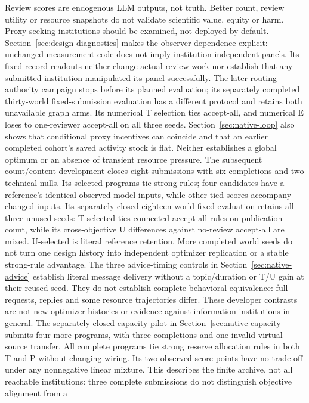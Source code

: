 Review scores are endogenous LLM outputs, not truth. Better count, review
utility or resource snapshots do not validate scientific value, equity or
harm. Proxy-seeking institutions should be examined, not deployed by default.
Section~\ref{sec:design-diagnostics} makes the observer dependence explicit:
unchanged measurement code does not imply institution-independent panels.
Its fixed-record readouts neither change actual review work nor establish
that any submitted institution manipulated its panel successfully.
The later routing-authority campaign stops before its planned evaluation;
its separately completed thirty-world fixed-submission evaluation has a
different protocol and retains both unavailable graph arms. Its numerical T
selection ties accept-all, and numerical E loses to one-reviewer accept-all
on all three seeds. Section~\ref{sec:native-loop} also shows that
conditional proxy incentives can coincide and that an earlier completed
cohort's saved activity stock is flat. Neither establishes a global optimum
or an absence of transient resource pressure.
The subsequent count/content development closes eight submissions with six
completions and two technical nulls. Its selected programs tie strong rules;
four candidates have a reference's identical observed model inputs, while
other tied scores accompany changed inputs. Its separately closed eighteen-world
fixed evaluation retains all three unused seeds: T-selected ties connected
accept-all rules on publication count, while its cross-objective U differences
against no-review accept-all are mixed. U-selected is literal reference
retention. More completed world seeds do not turn one design history into
independent optimizer replication or a stable strong-rule advantage.
The three advice-timing controls in Section~\ref{sec:native-advice} establish
literal message delivery without a topic/duration or T/U gain at their reused
seed. They do not establish complete behavioral equivalence: full requests,
replies and some resource trajectories differ. These developer contrasts are
not new optimizer histories or evidence against information institutions in
general. The separately closed capacity pilot in
Section~\ref{sec:native-capacity} submits four more programs, with three
completions and one invalid virtual-source transfer. All complete programs
tie strong reserve allocation rules in both T and P without changing wiring.
Its two observed score points have no trade-off under any nonnegative linear
mixture. This describes the finite archive, not all reachable institutions:
three complete submissions do not distinguish objective alignment from a
